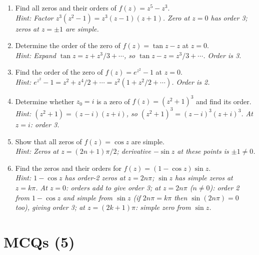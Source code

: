 \documentclass[12pt,a4paper]{article}
\begin{document}
\begin{enumerate}[label=\textbf{P\arabic*.}]

\item Find all zeros and their orders of $f(z)=z^5 - z^3$.\\
\textit{Hint: Factor $z^3(z^2-1)=z^3(z-1)(z+1)$. Zero at $z=0$ has order 3; zeros at $z=\pm 1$
are simple.}

\item Determine the order of the zero of $f(z)=\tan z - z$ at $z=0$.\\
\textit{Hint: Expand $\tan z = z + z^3/3 + \cdots$, so $\tan z - z = z^3/3 + \cdots$. Order is 3.}

\item Find the order of the zero of $f(z)=e^{z^2}-1$ at $z=0$.\\
\textit{Hint: $e^{z^2}-1 = z^2 + z^4/2 + \cdots = z^2(1+z^2/2+\cdots)$. Order is 2.}

\item Determine whether $z_0=i$ is a zero of $f(z)=(z^2+1)^3$ and find its order.\\
\textit{Hint: $(z^2+1)=(z-i)(z+i)$, so $(z^2+1)^3=(z-i)^3(z+i)^3$. At $z=i$: order 3.}

\item Show that all zeros of $f(z)=\cos z$ are simple.\\
\textit{Hint: Zeros at $z=(2n+1)\pi/2$; derivative $-\sin z$ at these points is
$\pm 1 \neq 0$.}

\item Find the zeros and their orders for $f(z)=(1-\cos z)\sin z$.\\
\textit{Hint: $1-\cos z$ has order-2 zeros at $z=2n\pi$; $\sin z$ has simple zeros at
$z=k\pi$. At $z=0$: orders add to give order 3; at $z=2n\pi$ ($n\neq 0$): order 2
from $1-\cos z$ and simple from $\sin z$ (if $2n\pi=k\pi$ then $\sin(2n\pi)=0$ too),
giving order 3; at $z=(2k+1)\pi$: simple zero from $\sin z$.}

\end{enumerate}

\section{MCQs (5)}
\end{document}
